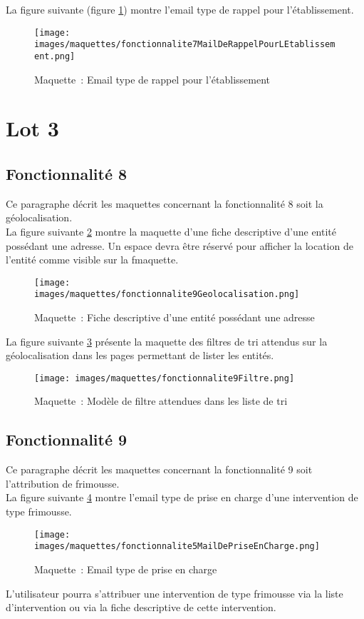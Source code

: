 La figure suivante (figure \ref{maquette7}) montre l'email type de rappel pour l'établissement.
\begin{figure}[H]
	\centering
	\texttt{[image: images/maquettes/fonctionnalite7MailDeRappelPourLEtablissement.png]}
	\caption{Maquette~: Email type de rappel pour l'établissement}
	\label{maquette7}
\end{figure}
\section{Lot 3}
\subsection{Fonctionnalité 8}
Ce paragraphe décrit les maquettes concernant la fonctionnalité 8 soit la géolocalisation. \\

La figure suivante \ref{maquette8-1} montre la maquette d'une fiche descriptive d'une entité possédant une adresse. Un espace devra être réservé pour afficher la location de l'entité comme visible sur la fmaquette.
\begin{figure}[H]
	\centering
	\texttt{[image: images/maquettes/fonctionnalite9Geolocalisation.png]}
	\caption{Maquette~: Fiche descriptive d'une entité possédant une adresse}
	\label{maquette8-1}
\end{figure}
La figure suivante \ref{maquette8-2} présente la maquette des filtres de tri attendus sur la géolocalisation dans les pages permettant de lister les entités.
\begin{figure}[H]
	\centering
	\texttt{[image: images/maquettes/fonctionnalite9Filtre.png]}
	\caption{Maquette~: Modèle de filtre attendues dans les liste de tri}
	\label{maquette8-2}
\end{figure}

\subsection{Fonctionnalité 9}
Ce paragraphe décrit les maquettes concernant la fonctionnalité 9 soit l'attribution de frimousse. \\

La figure suivante \ref{maquette9-1} montre l'email type de prise en charge d'une intervention de type frimousse.
\begin{figure}[H]
	\centering
	\texttt{[image: images/maquettes/fonctionnalite5MailDePriseEnCharge.png]}
	\caption{Maquette~: Email type de prise en charge}
	\label{maquette9-1}
\end{figure}
 L'utilisateur pourra s'attribuer une intervention de type frimousse via la liste d'intervention ou via la fiche descriptive de cette intervention.


